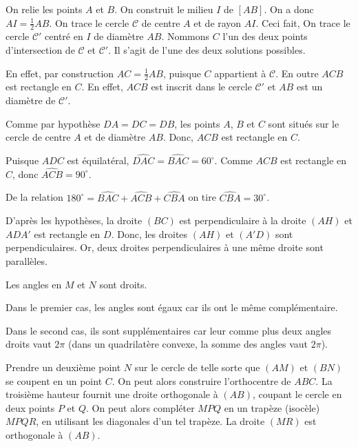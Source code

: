 \begin{Soln}{36}
On relie les points $A$ et $B$. On construit le milieu $I$ de $[AB]$. On a donc $AI = \frac{1}{2}AB$. On trace le cercle $\mathcal{C}$ de centre $A$ et de rayon $AI$. Ceci fait, On trace le cercle $\mathcal{C}'$ centr\'e en $I$ de diam\`etre $AB$. Nommons $C$ l'un des deux points d'intersection de $\mathcal{C}$ et $\mathcal{C}'$. Il s'agit de l'une des deux solutions possibles.

En effet, par construction $AC = \frac{1}{2} AB$, puisque $C$ appartient \`a $\mathcal{C}$. En outre $ACB$ est rectangle en $C$. En effet, $ACB$ est inscrit dans le cercle $\mathcal{C}'$ et $AB$ est un diam\`etre de $\mathcal{C}'$.
\end{Soln}
\begin{Soln}{37}
Comme par hypoth\`ese $DA = DC = DB$, les points $A$, $B$ et $C$ sont situ\'es sur le cercle de centre $A$ et de diam\`etre $AB$. Donc, $ACB$ est rectangle en $C$.

Puisque $ADC$ est \'equilat\'eral, $\widehat{DAC} = \widehat{BAC}= 60^{\circ}$. Comme $ACB$ est rectangle en $C$, donc $\widehat{ACB}=90^{\circ}$.

De la relation $180^{\circ} = \widehat{BAC} + \widehat{ACB} + \widehat{CBA}$ on tire $\widehat{CBA} = 30^{\circ}$.
\end{Soln}
\begin{Soln}{38}


D'après les hypothèses, la droite $(BC)$ est perpendiculaire \`a la droite $(AH)$ et $ADA'$ est rectangle en $D$. Donc, les droites $(AH)$ et $(A'D)$ sont perpendiculaires. Or, deux droites perpendiculaires à une même droite sont parallèles.
\end{Soln}
\begin{Soln}{39}
Les angles en $M$ et $N$ sont droits.

Dans le premier cas, les angles sont égaux car ils ont le même complémentaire.

Dans le second cas, ils sont supplémentaires car leur comme plus deux angles droits vaut $2\pi$ (dans un quadrilatère convexe, la somme des angles vaut $2\pi$).
\end{Soln}
\begin{Soln}{41}
Prendre un deuxième point $N$ sur le cercle de telle sorte que $(AM)$ et $(BN)$ se coupent en un point $C$. On peut alors construire l'orthocentre de $ABC$. La troisième hauteur fournit une droite orthogonale à $(AB)$, coupant le cercle en deux points $P$ et $Q$. On peut alors compléter $MPQ$ en un trapèze (isocèle) $MPQR$, en utilisant les diagonales d'un tel trapèze. La droite $(MR)$ est orthogonale à $(AB)$.
\end{Soln}
